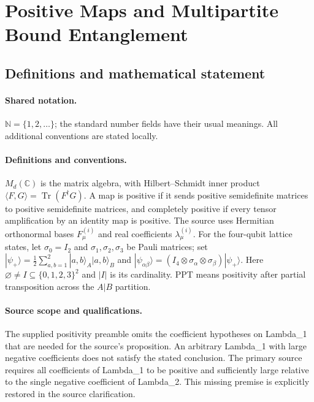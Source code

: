 \documentclass[11pt]{article}
\begin{document}
\section{Positive Maps and Multipartite Bound Entanglement}\label{statement}

\subsection{Definitions and mathematical statement}

\paragraph{Shared notation.}$\mathbb N=\{1,2,\ldots\}$; the standard number fields have their usual meanings. All additional conventions are stated locally.


\paragraph{Definitions and conventions.} $M_d(\mathbb C)$ is the matrix algebra, with Hilbert--Schmidt inner product $\langle F,G\rangle=\operatorname{Tr}(F^\dagger G)$. A map is positive if it sends positive semidefinite matrices to positive semidefinite matrices, and completely positive if every tensor amplification by an identity map is positive. The source uses Hermitian orthonormal bases $F^{(i)}_\mu$ and real coefficients $\lambda^{(i)}_\mu$. For the four-qubit lattice states, let $\sigma_0=I_2$ and $\sigma_1,\sigma_2,\sigma_3$ be Pauli matrices; set $|\psi_+\rangle=\tfrac12\sum_{a,b=1}^2|a,b\rangle_A|a,b\rangle_B$ and $|\psi_{\alpha\beta}\rangle=(I_4\otimes\sigma_\alpha\otimes\sigma_\beta)|\psi_+\rangle$. Here $\varnothing\ne I\subseteq\{0,1,2,3\}^2$ and $|I|$ is its cardinality. PPT means positivity after partial transposition across the $A|B$ partition.

\paragraph{Source scope and qualifications.} The supplied positivity preamble omits the coefficient hypotheses on Lambda\_1 that are needed for the source's proposition. An arbitrary Lambda\_1 with large negative coefficients does not satisfy the stated conclusion. The primary source requires all coefficients of Lambda\_1 to be positive and sufficiently large relative to the single negative coefficient of Lambda\_2. This missing premise is explicitly restored in the source clarification.
\end{document}
